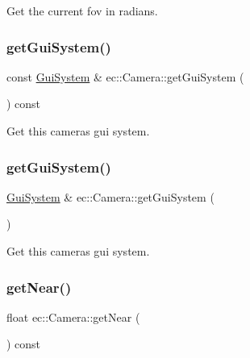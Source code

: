 Get the current fov in radians. 

\mbox{\label{classec_1_1_camera_a96f6414127f336eb9079ad30df80d1a7}} 
\subsubsection{\texorpdfstring{get\+Gui\+System()}{getGuiSystem()}\hspace{0.1cm}{\footnotesize\ttfamily [1/2]}}
{\footnotesize\ttfamily const \mbox{\hyperlink{classec_1_1_gui_system}{Gui\+System}} \& ec\+::\+Camera\+::get\+Gui\+System (\begin{DoxyParamCaption}{ }\end{DoxyParamCaption}) const}



Get this camera\textquotesingle{}s gui system. 

\mbox{\label{classec_1_1_camera_a3af91683c492e0094127f169a4927945}} 
\subsubsection{\texorpdfstring{get\+Gui\+System()}{getGuiSystem()}\hspace{0.1cm}{\footnotesize\ttfamily [2/2]}}
{\footnotesize\ttfamily \mbox{\hyperlink{classec_1_1_gui_system}{Gui\+System}} \& ec\+::\+Camera\+::get\+Gui\+System (\begin{DoxyParamCaption}{ }\end{DoxyParamCaption})}



Get this camera\textquotesingle{}s gui system. 

\mbox{\label{classec_1_1_camera_a02786d8adecb275e6182cf166b65edb4}} 
\subsubsection{\texorpdfstring{get\+Near()}{getNear()}}
{\footnotesize\ttfamily float ec\+::\+Camera\+::get\+Near (\begin{DoxyParamCaption}{ }\end{DoxyParamCaption}) const}



